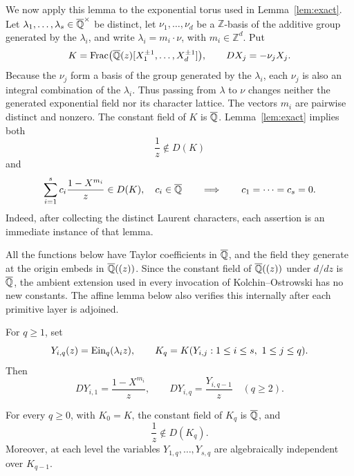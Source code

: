 We now apply this lemma to the exponential torus used in
Lemma~\ref{lem:exact}.  Let
\(\lambda_1,\ldots,\lambda_s\in\overline{\mathbb Q}^\times\) be distinct, let
\(\nu_1,\ldots,\nu_d\) be a \(\mathbb Z\)-basis of the additive group
generated by the \(\lambda_i\), and write
\(\lambda_i=m_i\mathbin{\cdot}\nu\), with
\(m_i\in\mathbb Z^d\).  Put
\[
 K=\operatorname{Frac}
 \bigl(\overline{\mathbb Q}(z)[X_1^{\pm1},\ldots,X_d^{\pm1}]\bigr),
 \qquad DX_j=-\nu_jX_j.
\]
Because the \(\nu_j\) form a basis of the group generated by the
\(\lambda_i\), each \(\nu_j\) is also an integral combination of the
\(\lambda_i\).  Thus passing from \(\lambda\) to \(\nu\) changes neither
the generated exponential field nor its character lattice.  The vectors
\(m_i\) are pairwise distinct and nonzero.
The constant field of \(K\) is \(\overline{\mathbb Q}\).  Lemma~\ref{lem:exact}
implies both
\begin{equation}\label{eq:depth-base-nonexact}
 \frac1z\notin D(K)
\end{equation}
and
\begin{equation}\label{eq:depth-first-layer-no-combination}
 \sum_{i=1}^s c_i\frac{1-X^{m_i}}z\in D(K),\quad c_i\in\overline{\mathbb Q}
 \qquad\Longrightarrow\qquad c_1=\cdots=c_s=0.
\end{equation}
Indeed, after collecting the distinct Laurent characters, each assertion
is an immediate instance of that lemma.

All the functions below have Taylor coefficients in \(\overline{\mathbb Q}\), and the
field they generate at the origin embeds in \(\overline{\mathbb Q}((z))\).  Since the
constant field of \(\overline{\mathbb Q}((z))\) under \(d/dz\) is \(\overline{\mathbb Q}\), the ambient
extension used in every invocation of Kolchin--Ostrowski has no new
constants.  The affine lemma below also verifies this internally after each
primitive layer is adjoined.

For \(q\geq1\), set
\[
 Y_{i,q}(z)=\operatorname{Ein}_{q}(\lambda_i z),
 \qquad
 K_q=K(Y_{i,j}:1\leq i\leq s,\ 1\leq j\leq q).
\]
Then
\begin{equation}\label{eq:depth-tower-derivatives}
 DY_{i,1}=\frac{1-X^{m_i}}z,
 \qquad
 DY_{i,q}=\frac{Y_{i,q-1}}z\quad(q\geq2).
\end{equation}

\begin{lemma}
\label{lem:depth-one-over-z-nonexact}
For every \(q\geq0\), with \(K_0=K\), the constant field of \(K_q\) is
\(\overline{\mathbb Q}\), and
\begin{equation}\label{eq:depth-one-over-z-all-levels}
 \frac1z\notin D(K_q).
\end{equation}
Moreover, at each level the variables
\(Y_{1,q},\ldots,Y_{s,q}\) are algebraically independent over
\(K_{q-1}\).
\end{lemma}

